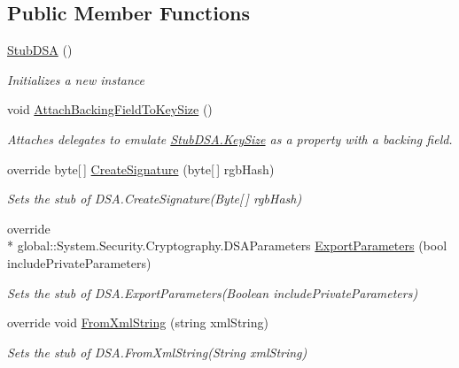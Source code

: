 \subsection*{Public Member Functions}
\begin{DoxyCompactItemize}
\item 
\hyperlink{class_system_1_1_security_1_1_cryptography_1_1_fakes_1_1_stub_d_s_a_a44d8bbb0c7b435dc0f58f890c0d714d3}{Stub\-D\-S\-A} ()
\begin{DoxyCompactList}\small\item\em Initializes a new instance\end{DoxyCompactList}\item 
void \hyperlink{class_system_1_1_security_1_1_cryptography_1_1_fakes_1_1_stub_d_s_a_ac4c3d3def6f142f95aea00ecb9228184}{Attach\-Backing\-Field\-To\-Key\-Size} ()
\begin{DoxyCompactList}\small\item\em Attaches delegates to emulate \hyperlink{class_system_1_1_security_1_1_cryptography_1_1_fakes_1_1_stub_d_s_a_ad37dd44d4c74c453656b7a8adecb49d2}{Stub\-D\-S\-A.\-Key\-Size} as a property with a backing field.\end{DoxyCompactList}\item 
override byte\mbox{[}$\,$\mbox{]} \hyperlink{class_system_1_1_security_1_1_cryptography_1_1_fakes_1_1_stub_d_s_a_abd922b6b30a7454734d3af5244130481}{Create\-Signature} (byte\mbox{[}$\,$\mbox{]} rgb\-Hash)
\begin{DoxyCompactList}\small\item\em Sets the stub of D\-S\-A.\-Create\-Signature(\-Byte\mbox{[}$\,$\mbox{]} rgb\-Hash)\end{DoxyCompactList}\item 
override \\*
global\-::\-System.\-Security.\-Cryptography.\-D\-S\-A\-Parameters \hyperlink{class_system_1_1_security_1_1_cryptography_1_1_fakes_1_1_stub_d_s_a_aa5b31bec55440804cb3fb987c60a2991}{Export\-Parameters} (bool include\-Private\-Parameters)
\begin{DoxyCompactList}\small\item\em Sets the stub of D\-S\-A.\-Export\-Parameters(\-Boolean include\-Private\-Parameters)\end{DoxyCompactList}\item 
override void \hyperlink{class_system_1_1_security_1_1_cryptography_1_1_fakes_1_1_stub_d_s_a_aa1f2fb32fceb9e01f04351db30d3eca9}{From\-Xml\-String} (string xml\-String)
\begin{DoxyCompactList}\small\item\em Sets the stub of D\-S\-A.\-From\-Xml\-String(\-String xml\-String)\end{DoxyCompactList}\item 

\end{DoxyCompactItemize}
